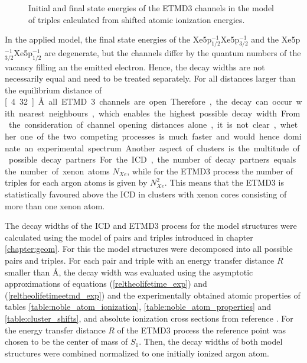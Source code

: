 \begin{figure}[htb]
 \centering
 
 \caption{Initial and final state energies of the \ac{ETMD}3 channels
          in the model of triples calculated from shifted atomic ionization
          energies.}
 \label{figure:ArXe_energy_etmd_curves}
\end{figure}

In the applied model, the final state energies of the
Xe5p$_{1/2}^{-1}$Xe5p$_{3/2}^{-1}$ and
the Xe5p$_{3/2}^{-1}$Xe5p$_{1/2}^{-1}$ are degenerate, but the channels
differ by the quantum
numbers of the vacancy filling an the emitted electron. Hence, the decay
widths are not necessarily equal and need to be treated separately.
For all distances larger than the equilibrium distance of \unit[4.32]{\AA}
all \ac{ETMD}3 channels are open. Therefore, the decay can occur with
nearest neighbours, which enables the highest possible decay width.

From the consideration of channel opening distances alone, it is not clear, whether
one of the two competing processes is much faster and would hence dominate
an experimental spectrum. Another aspect of clusters is the multitude of
possible decay partners. For the \ac{ICD}, the number of decay partners equals
the number of xenon atoms $N_{Xe}$, while for the \ac{ETMD}3 process the number
of triples for each argon atoms is given by $N_{Xe}^2$. This means that
the \ac{ETMD}3 is statistically favoured above the \ac{ICD} in clusters with
xenon cores consisting of more than one xenon atom.

The decay widths of the \ac{ICD} and \ac{ETMD}3 process for the model
structures were calculated using the model of pairs and triples introduced in
chapter \ref{chapter:geom}. For this the model structures were decomposed
into all possible pairs and triples. For each pair and triple with an energy
transfer distance $R$ smaller than \unit[11]{\AA}, the decay width was evaluated
using
the asymptotic approximations of equations
(\ref{reltheolifetime_exp}) and (\ref{reltheolifetimeetmd_exp}) and the
experimentally obtained atomic properties of tables
\ref{table:noble_atom_ionization}, \ref{table:noble_atom_properties} and
\ref{table:cluster_shifts}, and absolute ionization cross sections from reference
\cite{West78}. For the energy transfer distance $R$ of the \ac{ETMD}3 process
the reference point was chosen to be the center of mass of
$S_1$. 
Then, the decay widths of both model structures were combined normalized
to one initially ionized argon atom.

